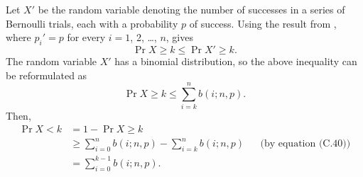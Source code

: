 Let $X'$ be the random variable denoting the number of successes in a series of Bernoulli trials, each with a probability $p$ of success.
Using the result from , where $p_i'=p$ for every $i=1$, 2, \dots, $n$, gives
\[
    \Pr{X\ge k} \le \Pr{X'\ge k}.
\]
The random variable $X'$ has a binomial distribution, so the above inequality can be reformulated as
\[
    \Pr{X\ge k} \le \sum_{i=k}^nb(i;n,p).
\]
Then,
\begin{align*}
    \Pr{X<k} &= 1-\Pr{X\ge k} \\
    &\ge \sum_{i=0}^nb(i;n,p)-\sum_{i=k}^nb(i;n,p) && \text{(by equation (C.40))} \\
    &= \sum_{i=0}^{k-1}b(i;n,p).
\end{align*}
